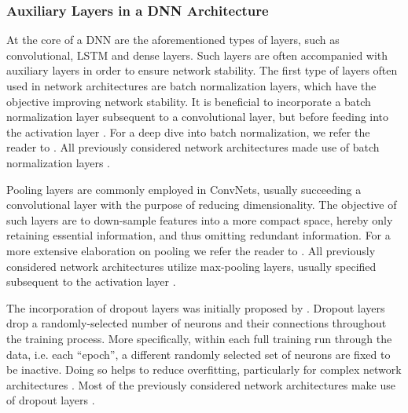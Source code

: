 \documentclass[fleqn,11pt]{paper}
\begin{document}
\subsubsection*{Auxiliary Layers in a DNN Architecture}
At the core of a DNN are the aforementioned types of layers, such as convolutional, LSTM and dense layers. Such layers are often accompanied with auxiliary layers in order to ensure network stability. The first type of layers often used in network architectures are batch normalization layers, which have the objective improving network stability. It is beneficial to incorporate a batch normalization layer subsequent to a convolutional layer, but before feeding into the activation layer \cite{ioffe2015batch}.  For a deep dive into batch normalization, we refer the reader to . All previously considered network architectures made use of batch normalization layers \cite{biswas2019cornet, dolmans2020perceived, schirrmeister2017deep, sun2019hybrid, tabar2016novel}.

Pooling layers are commonly employed in ConvNets, usually succeeding a convolutional layer with the purpose of reducing dimensionality. The objective of such layers are to down-sample features into a more compact space, hereby only retaining essential information, and thus omitting redundant information. For a more extensive elaboration on pooling we refer the reader to . All previously considered network architectures utilize max-pooling layers, usually specified subsequent to the activation layer \cite{biswas2019cornet, dolmans2020perceived, schirrmeister2017deep, sun2019hybrid, tabar2016novel}.

The incorporation of dropout layers was initially proposed by . Dropout layers drop a randomly-selected number of neurons and their connections throughout the training process. More specifically, within each full training run through the data, i.e. each \enquote{epoch}, a different randomly selected set of neurons are fixed to be inactive. Doing so helps to reduce overfitting, particularly for complex network architectures \cite{srivastava2014dropout}.  Most of the previously considered network architectures make use of dropout layers \cite{biswas2019cornet, dolmans2020perceived, schirrmeister2017deep, sun2019hybrid}.
\end{document}
